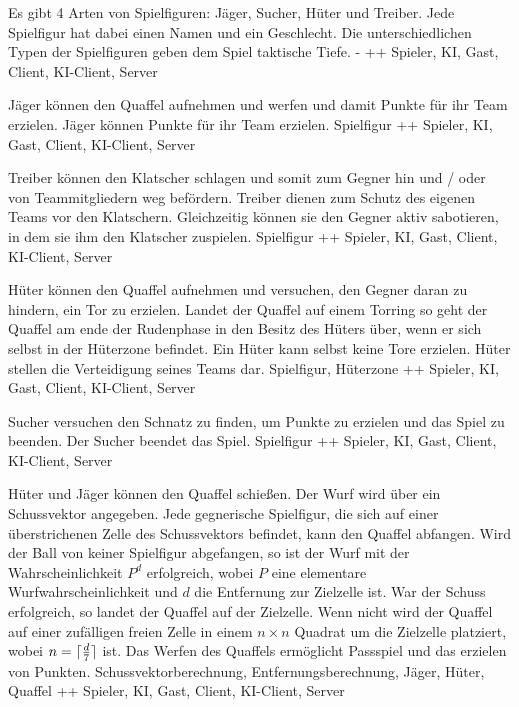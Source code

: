         {Es gibt 4 Arten von Spielfiguren: Jäger, Sucher, Hüter und Treiber. Jede Spielfigur hat dabei einen Namen und ein Geschlecht.}
        {Die unterschiedlichen Typen der Spielfiguren geben dem Spiel taktische Tiefe.}
        {-}
        {++}
        {Spieler, KI, Gast, Client, KI-Client, Server}

        {Jäger können den Quaffel aufnehmen und werfen und damit Punkte für ihr Team erzielen.}
        {Jäger können Punkte für ihr Team erzielen.}
        {Spielfigur}
        {++}
        {Spieler, KI, Gast, Client, KI-Client, Server}

        {Treiber können den Klatscher schlagen und somit zum Gegner hin und / oder von Teammitgliedern weg befördern.}
        {Treiber dienen zum Schutz des eigenen Teams vor den Klatschern. Gleichzeitig können sie den Gegner aktiv sabotieren, in dem sie ihm den Klatscher zuspielen.}
        {Spielfigur}
        {++}
        {Spieler, KI, Gast, Client, KI-Client, Server}

        {Hüter können den Quaffel aufnehmen und versuchen, den Gegner daran zu hindern, ein Tor zu erzielen. Landet der Quaffel auf einem Torring so geht der Quaffel am ende der Rudenphase in den Besitz des Hüters über, wenn er sich selbst in der Hüterzone befindet. Ein Hüter kann selbst keine Tore erzielen.}
        {Hüter stellen die Verteidigung seines Teams dar.}
        {Spielfigur, Hüterzone}
        {++}
        {Spieler, KI, Gast, Client, KI-Client, Server}

        {Sucher versuchen den Schnatz zu finden, um Punkte zu erzielen und das Spiel zu beenden.}
        {Der Sucher beendet das Spiel.}
        {Spielfigur}
        {++}
        {Spieler, KI, Gast, Client, KI-Client, Server}
        
        {Hüter und Jäger können den Quaffel schießen. Der Wurf wird über ein Schussvektor angegeben. Jede gegnerische Spielfigur, die sich auf einer überstrichenen Zelle des Schussvektors befindet, kann den Quaffel abfangen. Wird der Ball von keiner Spielfigur abgefangen, so ist der Wurf mit der Wahrscheinlichkeit $P^d$ erfolgreich, wobei $P$ eine elementare Wurfwahrscheinlichkeit und $d$ die Entfernung zur Zielzelle ist. War der Schuss erfolgreich, so landet der Quaffel auf der Zielzelle. Wenn nicht wird der Quaffel auf einer zufälligen freien Zelle in einem $n\times n$ Quadrat um die Zielzelle platziert, wobei $n=\lceil \frac{d}{7}\rceil$ ist.}			
        {Das Werfen des Quaffels ermöglicht Passspiel und das erzielen von Punkten.}
        {Schussvektorberechnung, Entfernungsberechnung, Jäger, Hüter, Quaffel}
        {++}
        {Spieler, KI, Gast, Client, KI-Client, Server}
        
